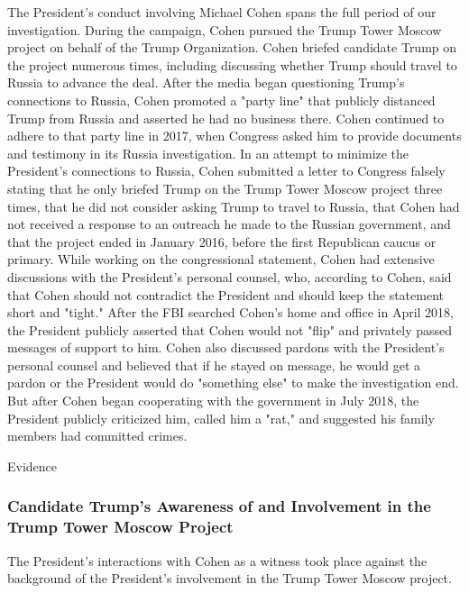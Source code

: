 The President's conduct involving Michael Cohen spans the full period of our investigation.
During the campaign, Cohen pursued the Trump Tower Moscow project on behalf of the Trump Organization.
Cohen briefed candidate Trump on the project numerous times, including discussing whether Trump should travel to Russia to advance the deal.
After the media began questioning Trump's connections to Russia, Cohen promoted a "party line" that publicly distanced Trump from Russia and asserted he had no business there.
Cohen continued to adhere to that party line in 2017, when Congress asked him to provide documents and testimony in its Russia investigation.
In an attempt to minimize the President's connections to Russia, Cohen submitted a letter to Congress falsely stating that he only briefed Trump on the Trump Tower Moscow project three times, that he did not consider asking Trump to travel to Russia, that Cohen had not received a response to an outreach he made to the Russian government, and that the project ended in January 2016, before the first Republican caucus or primary.
While working on the congressional statement, Cohen had extensive discussions with the President's personal counsel, who, according to Cohen, said that Cohen should not contradict the President and should keep the statement short and "tight."
After the FBI searched Cohen's home and office in April 2018, the President publicly asserted that Cohen would not "flip" and privately passed messages of support to him.
Cohen also discussed pardons with the President's personal counsel and believed that if he stayed on message, he would get a pardon or the President would do "something else" to make the investigation end.
But after Cohen began cooperating with the government in July 2018, the President publicly criticized him, called him a "rat," and suggested his family members had committed crimes.

Evidence

\subsubsection{Candidate Trump's Awareness of and Involvement in the Trump Tower Moscow Project}

The President's interactions with Cohen as a witness took place against the background of the President's involvement in the Trump Tower Moscow project.

